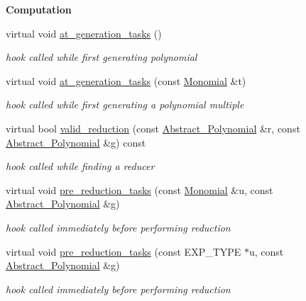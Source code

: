 \begin{Indent}\textbf{ Computation}\par
\begin{DoxyCompactItemize}
\item 
virtual void \hyperlink{group__strategygroup_a3c2e31f0e3323da59564edc6ee3557af}{at\+\_\+generation\+\_\+tasks} ()
\begin{DoxyCompactList}\small\item\em hook called while first generating polynomial \end{DoxyCompactList}\item 
virtual void \hyperlink{group__strategygroup_a6683749a5fb30b6f91075a28899fbfe7}{at\+\_\+generation\+\_\+tasks} (const \hyperlink{group__polygroup_class_monomial}{Monomial} \&t)
\begin{DoxyCompactList}\small\item\em hook called while first generating a polynomial {\itshape multiple} \end{DoxyCompactList}\item 
virtual bool \hyperlink{group__strategygroup_a996754ff163b0ff32d783ec723ac35be}{valid\+\_\+reduction} (const \hyperlink{group__polygroup_class_abstract___polynomial}{Abstract\+\_\+\+Polynomial} \&r, const \hyperlink{group__polygroup_class_abstract___polynomial}{Abstract\+\_\+\+Polynomial} \&g) const
\begin{DoxyCompactList}\small\item\em hook called while finding a reducer \end{DoxyCompactList}\item 
virtual void \hyperlink{group__strategygroup_a077b9fb020596f92ed0cb38fea2a0b71}{pre\+\_\+reduction\+\_\+tasks} (const \hyperlink{group__polygroup_class_monomial}{Monomial} \&u, const \hyperlink{group__polygroup_class_abstract___polynomial}{Abstract\+\_\+\+Polynomial} \&g)
\begin{DoxyCompactList}\small\item\em hook called immediately before performing reduction \end{DoxyCompactList}\item 
virtual void \hyperlink{group__strategygroup_a0d71db50c58a24f48f94eae6a48c2149}{pre\+\_\+reduction\+\_\+tasks} (const E\+X\+P\+\_\+\+T\+Y\+PE $\ast$u, const \hyperlink{group__polygroup_class_abstract___polynomial}{Abstract\+\_\+\+Polynomial} \&g)
\begin{DoxyCompactList}\small\item\em hook called immediately before performing reduction \end{DoxyCompactList}\end{DoxyCompactItemize}
\end{Indent}
